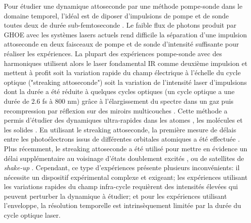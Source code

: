 Pour étudier une dynamique attoseconde par une méthode pompe-sonde dans le domaine temporel, l'idéal est de diposer d'impulsions de pompe et de sonde toutes deux de durée sub-femtoseconde . Le faible flux de photons produit par GHOE avec les systèmes lasers actuels rend difficile la séparation d'une impulsion attoseconde en deux faisceaux de pompe et de sonde d'intensité suffisante pour réaliser les expériences. La plupart des expériences pompe-sonde avec des harmoniques utilisent alors le laser fondamental IR comme deuxième impulsion et mettent à profit soit la variation rapide du champ électrique à l'échelle du cycle optique ("streaking attoseconde") soit la variation de l'intensité laser d'impulsions dont la durée a été réduite à quelques cycles optiques (un cycle optique a une durée de 2.6 fs à 800 nm) grâce à l'élargissement du spectre dans un gaz puis recompression par réflexion sur des miroirs multicouches . Cette méthode a permis d'étudier des dynamiques ultra-rapides dans les atomes , les molécules  et les solides . En utilisant le streaking attoseconde, la première mesure de délais entre les photoélectrons issus de différentes orbitales atomiques a été effectuée . Plus récemment, le streaking attoseconde a été utilisé pour mettre en évidence un délai supplémentaire au voisinage d'états doublement excités , ou de satellites de \textit{shake-up} . Cependant, ce type d'expériences présente plusieurs inconvénients: il nécessite un dispositif expérimental complexe et exigeant; les expériences utilisant les variations rapides du champ infra-cycle requièrent des intensités élevées qui peuvent perturber la dynamique à étudier; et pour les expériences utilisant l'enveloppe, la résolution temporelle est intrinsèquement limitée par la durée du cycle optique laser.

